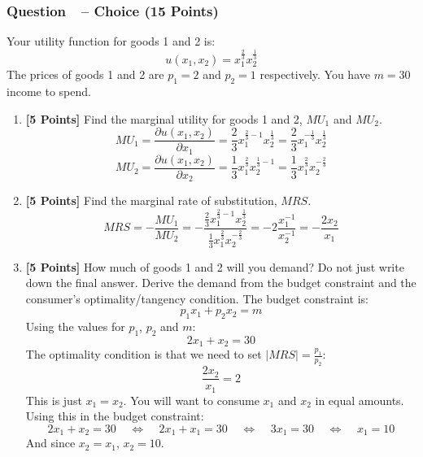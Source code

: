 \documentclass[10pt]{article}
\newcounter{question}[section]
\newcommand{\question}[1]{\refstepcounter{question}
  \subsubsection*{Question~\thequestion~-- #1}}
\newenvironment{subquestions}{
  \begin{enumerate}[label=(\roman*)]}{\end{enumerate}}
\begin{document}
\question{Choice (15 Points)}
Your utility function for goods 1 and 2 is:
\[
  u\left( x_1,x_2 \right) = x_1^{\frac{2}{3}}x_2^{\frac{1}{3}}
\]
The prices of goods 1 and 2 are $p_1=2$ and $p_2=1$ respectively. You have $m=30$
income to spend.
\begin{subquestions}
  \item \textbf{[5 Points]} Find the marginal utility for goods 1 and 2,
    $MU_1$ and $MU_2$.
    \textcolor{solution-color}{
      \[
        MU_1 = \frac{\partial u\left( x_1,x_2 \right)}{\partial x_1}
        =\frac{2}{3}x_1^{\frac{2}{3}-1}x_2^{\frac{1}{3}}=
        \frac{2}{3}x_1^{-\frac{1}{3}}x_2^{\frac{1}{3}}
      \]
      \[
        MU_2 = \frac{\partial u\left( x_1,x_2 \right)}{\partial x_2}
        =\frac{1}{3}x_1^{\frac{2}{3}}x_2^{\frac{1}{3}-1}=
        \frac{1}{3}x_1^{\frac{2}{3}}x_2^{-\frac{2}{3}}
      \]
    }

  \item \textbf{[5 Points]} Find the marginal rate of substitution, $MRS$.
    \textcolor{solution-color}{
      \[
      MRS=- \frac{MU_1}{MU_2} =
      -\frac{\frac{2}{3}x_1^{\frac{2}{3}-1}x_2^{\frac{1}{3}}}
      {\frac{1}{3}x_1^{\frac{2}{3}}x_2^{-\frac{2}{3}}}=
      -2\frac{x_1^{-1}}{x_2^{-1}} = -\frac{2x_2}{x_1}
    \]
    }

  \item \textbf{[5 Points]} How much of goods 1 and 2 will you demand? Do not
    just write down the final answer. Derive the demand from the budget constraint
    and the consumer's optimality/tangency condition.
    \textcolor{solution-color}{
      The budget constraint is:
      \[
        p_1x_1+p_2x_2=m
      \]
      Using the values for $p_1$, $p_2$ and $m$:
      \[
        2x_1 + x_2 = 30
      \]
      The optimality condition is that we need to set
      $\left| MRS \right|=\frac{p_1}{p_2}$:
      \[
        \frac{2x_2}{x_1}=2
      \]
      This is just $x_1=x_2$. You will want to consume $x_1$ and $x_2$ in equal
      amounts. Using this in the budget constraint:
      \[
        2x_1 + x_2 = 30 \;\;\;\;\Longleftrightarrow \;\;\;\;
        2x_1 + x_1 = 30 \;\;\;\;\Longleftrightarrow \;\;\;\;
        3x_1 = 30 \;\;\;\;\Longleftrightarrow \;\;\;\; x_1 = 10
      \]
      And since $x_2=x_1$, $x_2 = 10$.
    }

\end{subquestions}
\end{document}
